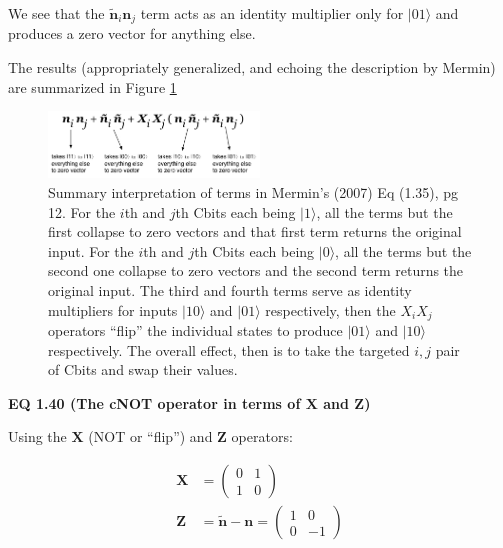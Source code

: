 \documentclass{article}
\begin{document}
We see that the $\bm{\widetilde{n}}_i\bm{n}_j$ term acts as an identity multiplier only for $|01\rangle$ and produces a zero vector for anything else.

\vspace{0.125in}

The results (appropriately generalized, and echoing the description by Mermin) are summarized in Figure \ref{fig:Eq135Interpret}

\begin{figure}[htb]
  \centering
  \includegraphics[width=0.5\textwidth]{FIGURES/Mermin_(2007)_Support_(Eq_135).jpg}
  \caption{Summary interpretation of terms in Mermin's (2007) Eq (1.35), pg 12. For the $i$th and $j$th Cbits each being $|1\rangle$, all the terms but the first collapse to zero vectors and that first term returns the original input. For the $i$th and $j$th Cbits each being $|0\rangle$, all the terms but the second one collapse to zero vectors and the second term returns the original input. The third and fourth terms serve as identity multipliers for inputs $|10\rangle$ and $|01\rangle$ respectively, then the $X_iX_j$ operators ``flip'' the individual states to produce $|01\rangle$ and $|10\rangle$ respectively. The overall effect, then is to take the targeted $i,j$ pair of Cbits and swap their values.}
  \label{fig:Eq135Interpret}
\end{figure}


\vspace{0.25in}

\textbf{EQ 1.40 (The cNOT operator in terms of $\bm{X}$ and $\bm{Z}$)}\par

\vspace{0.25in}

Using the $\bm{X}$ (NOT or ``flip'') and $\bm{Z}$ operators:

\begin{align*}
  \bm{X} &= \begin{pmatrix}0 & 1\\1 & 0\end{pmatrix}\\
  \bm{Z} &= \bm{\widetilde{n}} - \bm{n} = \begin{pmatrix}1 & 0\\0 & -1\end{pmatrix}
\end{align*}
\end{document}
